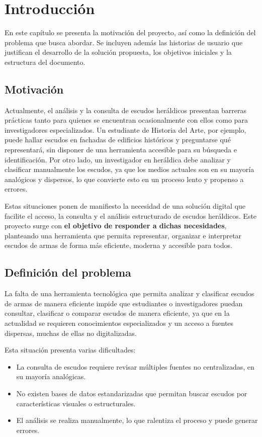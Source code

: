 \chapter{Introducción}

En este capítulo se presenta la motivación del proyecto, así como la definición
del problema que busca abordar. Se incluyen además las historias de usuario que
justifican el desarrollo de la solución propuesta, los objetivos iniciales y la
estructura del documento.

\section{Motivación}
Actualmente, el análisis y la consulta de escudos heráldicos presentan barreras
prácticas tanto para quienes se encuentran ocasionalmente con ellos como para 
investigadores especializados. Un estudiante de Historia del Arte, por ejemplo, 
puede hallar escudos en fachadas de edificios históricos y preguntarse qué representará,
sin disponer de una herramienta accesible para su búsqueda e identificación. 
Por otro lado,  un investigador en heráldica debe analizar y clasificar manualmente
los escudos, ya que los medios actuales son en su mayoría analógicos y dispersos, lo 
que convierte esto en un proceso lento y propenso a errores.

Estas situaciones ponen de manifiesto la necesidad de una solución digital que
facilite el acceso, la consulta y el análisis estructurado de escudos heráldicos. 
Este proyecto surge con \textbf{el objetivo de responder a dichas necesidades}, planteando 
una herramienta que permita representar, organizar e interpretar escudos de armas 
de forma más eficiente, moderna y accesible para todos.

\section{Definición del problema}

La falta de una herramienta tecnológica que permita analizar y clasificar escudos de 
armas de manera eficiente impide que estudiantes o investigadores puedan consultar, 
clasificar o comparar escudos de manera eficiente, ya que en la actualidad se requieren
conocimientos especializados y un acceso a fuentes dispersas, muchas de ellas no 
digitalizadas.

Esta situación presenta varias dificultades:

\begin{itemize}
    \item La consulta de escudos requiere revisar múltiples fuentes no centralizadas, 
    en su mayoría analógicas.
    \item No existen bases de datos estandarizadas que permitan buscar escudos por
    características visuales o estructurales.
    \item El análisis se realiza manualmente, lo que ralentiza el proceso y puede
    generar errores.
\end{itemize}

